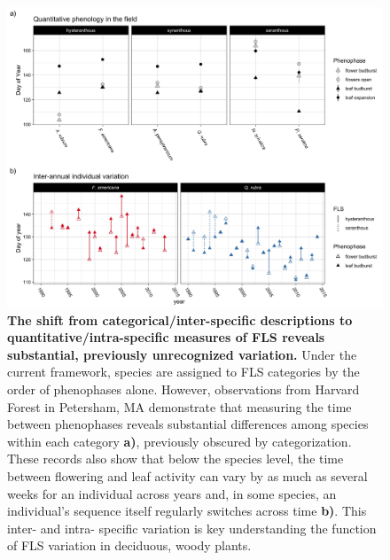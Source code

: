 \documentclass{article}
\begin{document}
 
 \begin{figure}[h!]
        \centering
          \includegraphics[width=\textwidth]{..//HarvardForest/FLS_viz.jpeg}
          \caption{\textbf{The shift from categorical/inter-specific descriptions to quantitative/intra-specific measures of FLS reveals substantial, previously unrecognized variation.} Under the current framework, species are assigned to FLS categories by the order of phenophases alone. However, observations from Harvard Forest in Petersham, MA demonstrate that measuring the time between phenophases reveals substantial differences among species within each category \textbf{a)}, previously obscured by categorization. These records also show that below the species level, the time between flowering and leaf activity can vary by as much as several weeks for an individual across years and, in some species, an individual's sequence itself regularly switches across time  \textbf{b)}. This inter- and intra- specific variation is key understanding the function of FLS variation in deciduous, woody plants.}
        \label{fig:vizzy}
    \end{figure}
    
\end{document}
